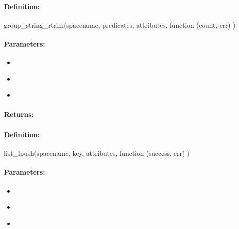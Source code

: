 \paragraph{Definition:}
\begin{javascriptcode}
group_string_rtrim(spacename, predicates, attributes, function (count, err) {})
\end{javascriptcode}
\paragraph{Parameters:}
\begin{itemize}[noitemsep]
\item {}\\

\item {}\\

\item {}\\

\end{itemize}

\paragraph{Returns:}


\pagebreak
\subsubsection{}
\label{api:nodejs:list_lpush}


\paragraph{Definition:}
\begin{javascriptcode}
list_lpush(spacename, key, attributes, function (success, err) {})
\end{javascriptcode}
\paragraph{Parameters:}
\begin{itemize}[noitemsep]
\item {}\\

\item {}\\

\item {}\\

\end{itemize}

